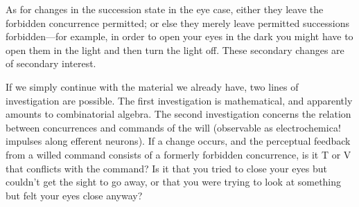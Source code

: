 \documentclass[10pt,twoside,draft]{memoir}
\begin{document}
{As for changes in the succession state in the eye case, either they leave 
the forbidden concurrence permitted; or else they merely leave permitted 
successions forbidden---for example, in order to open your eyes in the dark 
you might have to open them in the light and then turn the light off. These 
secondary changes are of secondary interest. 

If we simply continue with the material we already have, two lines of 
investigation are possible. The first investigation is mathematical, and 
apparently amounts to combinatorial algebra. The second investigation 
concerns the relation between concurrences and commands of the will 
(observable as electrochemica! impulses along efferent neurons). If a change 
occurs, and the perceptual feedback from a willed command consists of a 
formerly forbidden concurrence, is it T or V that conflicts with the 
command? Is it that you tried to close your eyes but couldn't get the sight 
to go away, or that you were trying to look at something but felt your eyes 
close anyway? 

}
\end{document}
